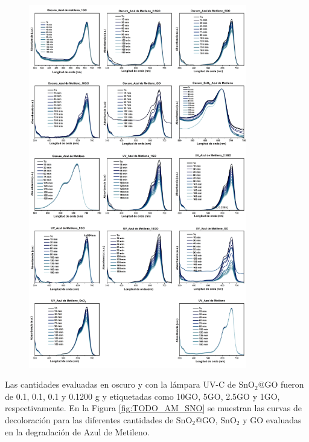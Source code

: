 \documentclass[12pt]{article}
\begin{document}
\begin{figure}[H]
    	   \begin{center}
     	  	\includegraphics[width = 0.85\textwidth]{Imagenes/MB/BM_FOTOCATALISIS.png}
    	   \end{center} 
        \end{figure}
Las cantidades evaluadas en oscuro y con la lámpara UV-C de SnO$\displaystyle _{2}$@GO fueron de 0.1, 0.1, 0.1 y 0.1200 g  y etiquetadas como 10GO, 5GO, 2.5GO y 1GO, respectivamente.  En la Figura \ref{fig:TODO_AM_SNO} se muestran las curvas de decoloración para las diferentes cantidades de SnO$\displaystyle _{2}$@GO, SnO$\displaystyle _{2}$ y GO evaluadas en la degradación de Azul de Metileno.\vspace{1em} %
\end{document}
